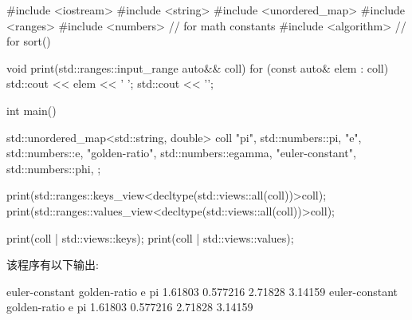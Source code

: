 
\begin{cpp}
#include <iostream>
#include <string>
#include <unordered_map>
#include <ranges>
#include <numbers> // for math constants
#include <algorithm> // for sort()

void print(std::ranges::input_range auto&& coll)
{
	for (const auto& elem : coll) {
		std::cout << elem << ' ';
	}
	std::cout << '\n';
}

int main()
{
	std::unordered_map<std::string, double> coll{
		{"pi", std::numbers::pi},
		{"e", std::numbers::e},
		{"golden-ratio", std::numbers::egamma},
		{"euler-constant", std::numbers::phi},
	};
	
	print(std::ranges::keys_view<decltype(std::views::all(coll))>{coll});
	print(std::ranges::values_view<decltype(std::views::all(coll))>{coll});
	
	print(coll | std::views::keys);
	print(coll | std::views::values);
}
\end{cpp}

该程序有以下输出:

\begin{shell}
euler-constant golden-ratio e pi
1.61803 0.577216 2.71828 3.14159
euler-constant golden-ratio e pi
1.61803 0.577216 2.71828 3.14159
\end{shell}










